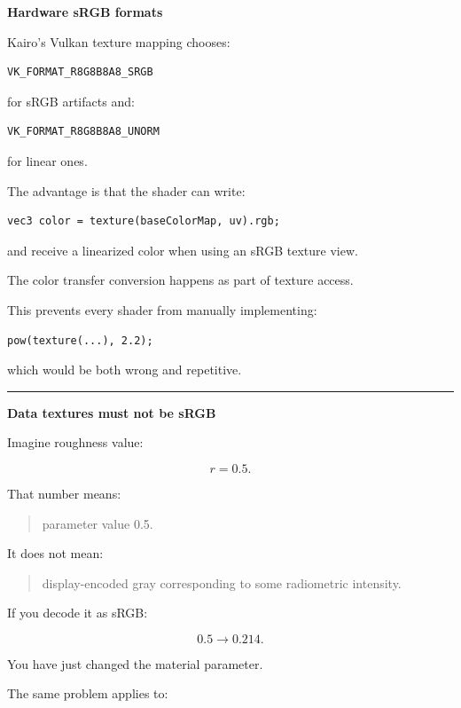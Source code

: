 \textbf{Hardware sRGB formats}

Kairo's Vulkan texture mapping chooses:

\begin{verbatim}
VK_FORMAT_R8G8B8A8_SRGB
\end{verbatim}

for sRGB artifacts and:

\begin{verbatim}
VK_FORMAT_R8G8B8A8_UNORM
\end{verbatim}

for linear ones.

The advantage is that the shader can write:

\begin{verbatim}
vec3 color = texture(baseColorMap, uv).rgb;
\end{verbatim}

and receive a linearized color when using an sRGB texture view.

The color transfer conversion happens as part of texture access.

This prevents every shader from manually implementing:

\begin{verbatim}
pow(texture(...), 2.2);
\end{verbatim}

which would be both wrong and repetitive.

\begin{center}\rule{0.5\linewidth}{0.5pt}\end{center}

\textbf{Data textures must not be sRGB}

Imagine roughness value:

\[
r=0.5.
\]

That number means:

\begin{quote}
parameter value 0.5.
\end{quote}

It does not mean:

\begin{quote}
display-encoded gray corresponding to some radiometric intensity.
\end{quote}

If you decode it as sRGB:

\[
0.5\rightarrow0.214.
\]

You have just changed the material parameter.

The same problem applies to:

